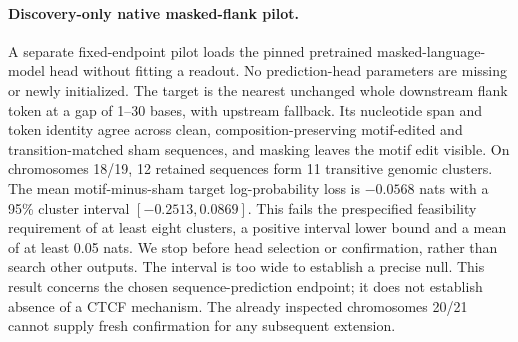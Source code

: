 \paragraph{Discovery-only native masked-flank pilot.}
A separate fixed-endpoint pilot loads the pinned pretrained masked-language-model head without fitting a readout. No prediction-head parameters are missing or newly initialized. The target is the nearest unchanged whole downstream flank token at a gap of 1--30 bases, with upstream fallback. Its nucleotide span and token identity agree across clean, composition-preserving motif-edited and transition-matched sham sequences, and masking leaves the motif edit visible. On chromosomes 18/19, 12 retained sequences form 11 transitive genomic clusters. The mean motif-minus-sham target log-probability loss is $-0.0568$ nats with a 95\% cluster interval $[-0.2513, 0.0869]$. This fails the prespecified feasibility requirement of at least eight clusters, a positive interval lower bound and a mean of at least 0.05 nats. We stop before head selection or confirmation, rather than search other outputs. The interval is too wide to establish a precise null. This result concerns the chosen sequence-prediction endpoint; it does not establish absence of a CTCF mechanism. The already inspected chromosomes 20/21 cannot supply fresh confirmation for any subsequent extension.
